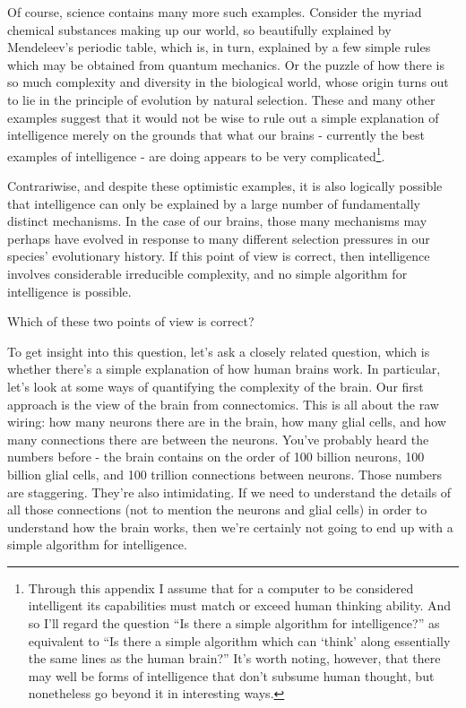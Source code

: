 \documentclass[a4paper,twoside,10pt]{book}
\begin{document}
Of course, science contains many more such examples. Consider the myriad chemical substances making up our world, so beautifully explained by Mendeleev's periodic table, which is, in turn, explained by a few simple rules which may be obtained from quantum mechanics. Or the puzzle of how there is so much complexity and diversity in the biological world, whose origin turns out to lie in the principle of evolution by natural selection. These and many other examples suggest that it would not be wise to rule out a simple explanation of intelligence merely on the grounds that what our brains - currently the best examples of intelligence - are doing appears to be very complicated\footnote{Through this appendix I assume that for a computer to be considered intelligent its capabilities must match or exceed human thinking ability. And so I'll regard the question ``Is there a simple algorithm for intelligence?'' as equivalent to ``Is there a simple algorithm which can `think' along essentially the same lines as the human brain?'' It's worth noting, however, that there may well be forms of intelligence that don't subsume human thought, but nonetheless go beyond it in interesting ways.}.

Contrariwise, and despite these optimistic examples, it is also logically possible that intelligence can only be explained by a large number of fundamentally distinct mechanisms. In the case of our brains, those many mechanisms may perhaps have evolved in response to many different selection pressures in our species' evolutionary history. If this point of view is correct, then intelligence involves considerable irreducible complexity, and no simple algorithm for intelligence is possible.

Which of these two points of view is correct?

To get insight into this question, let's ask a closely related question, which is whether there's a simple explanation of how human brains work. In particular, let's look at some ways of quantifying the complexity of the brain. Our first approach is the view of the brain from connectomics. This is all about the raw wiring: how many neurons there are in the brain, how many glial cells, and how many connections there are between the neurons. You've probably heard the numbers before - the brain contains on the order of 100 billion neurons, 100 billion glial cells, and 100 trillion connections between neurons. Those numbers are staggering. They're also intimidating. If we need to understand the details of all those connections (not to mention the neurons and glial cells) in order to understand how the brain works, then we're certainly not going to end up with a simple algorithm for intelligence.
\end{document}
